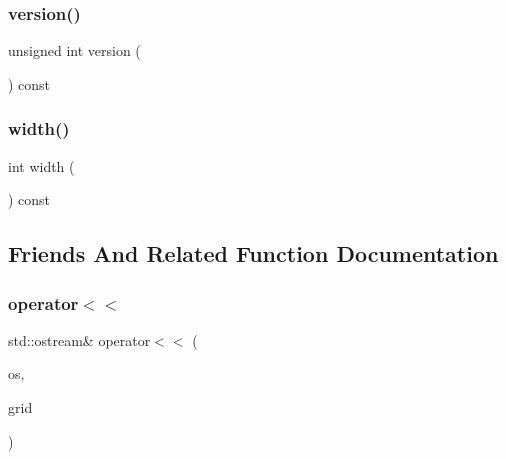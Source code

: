 \mbox{\label{classSparseGrid_a0aa696ccb72cbf928535d6b646bac1aa}} 
\subsubsection{\texorpdfstring{version()}{version()}}
{\footnotesize\ttfamily unsigned int version (\begin{DoxyParamCaption}{ }\end{DoxyParamCaption}) const}

\mbox{\label{classSparseGrid_ad72663daf610f2a0833a2fc3d78e4fdf}} 
\subsubsection{\texorpdfstring{width()}{width()}}
{\footnotesize\ttfamily int width (\begin{DoxyParamCaption}{ }\end{DoxyParamCaption}) const}



\subsection{Friends And Related Function Documentation}
\mbox{\label{classSparseGrid_a9fbe60d6b428febe772a67368dc1ca64}} 
\subsubsection{\texorpdfstring{operator$<$$<$}{operator<<}}
{\footnotesize\ttfamily std\+::ostream\& operator$<$$<$ (\begin{DoxyParamCaption}\item[{std\+::ostream \&}]{os,  }\item[{const \mbox{\hyperlink{classSparseGrid}{Sparse\+Grid}}$<$ T $>$ \&}]{grid }\end{DoxyParamCaption})\hspace{0.3cm}{\ttfamily [friend]}}

\mbox{\label{classSparseGrid_abda71b3d47a0135d733ca823e577b6a0}} 

